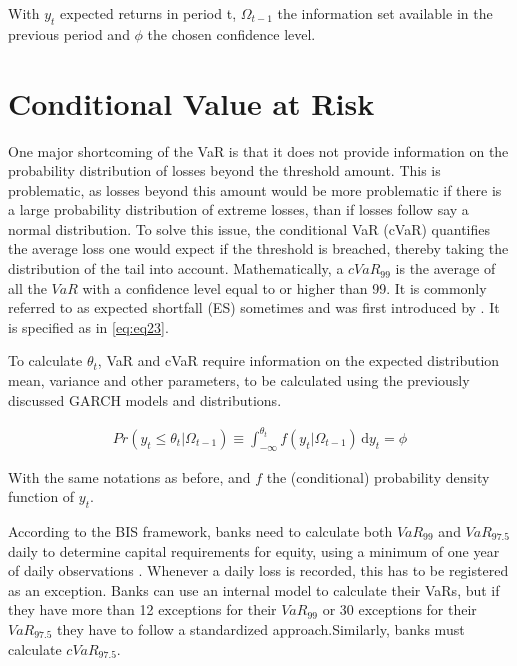 \documentclass[a4paper, twoside]{templates/ociamthesis}
\begin{document}
With \(y_t\) expected returns in period t, \(\Omega_{t-1}\) the information set available in the previous period and \(\phi\) the chosen confidence level.

\hypertarget{conditional-value-at-risk}{%
\section{Conditional Value at Risk}\label{conditional-value-at-risk}}

One major shortcoming of the VaR is that it does not provide information on the probability distribution of losses beyond the threshold amount. This is problematic, as losses beyond this amount would be more problematic if there is a large probability distribution of extreme losses, than if losses follow say a normal distribution. To solve this issue, the conditional VaR (cVaR) quantifies the average loss one would expect if the threshold is breached, thereby taking the distribution of the tail into account. Mathematically, a \(cVaR_{99}\) is the average of all the \(VaR\) with a confidence level equal to or higher than 99. It is commonly referred to as expected shortfall (ES) sometimes and was first introduced by \autocite{bertsimas2004}. It is specified as in \eqref{eq:eq23}.

To calculate \(\theta_t\), VaR and cVaR require information on the expected distribution mean, variance and other parameters, to be calculated using the previously discussed GARCH models and distributions.

\begin{align}
Pr(y_t \le \theta_t | \Omega_{t-1}) \equiv \int_{-\infty}^{\theta_t} \! f(y_t | \Omega_{t-1}) \, \mathrm{d}y_t = \phi
 \label{eq:eq23}
\end{align}

With the same notations as before, and \(f\) the (conditional) probability density function of \(y_t\).

According to the BIS framework, banks need to calculate both \(VaR_{99}\) and \(VaR_{97.5}\) daily to determine capital requirements for equity, using a minimum of one year of daily observations \autocite{baselcommitteeonbankingsupervision2016}. Whenever a daily loss is recorded, this has to be registered as an exception. Banks can use an internal model to calculate their VaRs, but if they have more than 12 exceptions for their \(VaR_{99}\) or 30 exceptions for their \(VaR_{97.5}\) they have to follow a standardized approach.Similarly, banks must calculate \(cVaR_{97.5}\).
\end{document}

